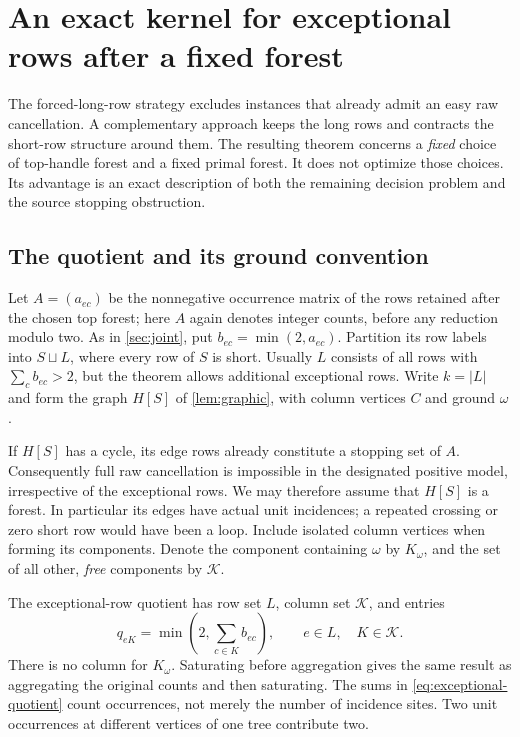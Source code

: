 \section{An exact kernel for exceptional rows after a fixed forest}
\label{sec:exceptional}

The forced-long-row strategy excludes instances that already admit an easy
raw cancellation. A complementary approach keeps the long rows and contracts
the short-row structure around them. The resulting theorem concerns a
\emph{fixed} choice of top-handle forest and a fixed primal forest. It does
not optimize those choices. Its advantage is an exact description of both
the remaining decision problem and the source stopping obstruction.

\subsection{The quotient and its ground convention}

Let $A=(a_{ec})$ be the nonnegative occurrence matrix of the rows retained
after the chosen top forest; here $A$ again denotes integer counts, before
any reduction modulo two. As in \cref{sec:joint}, put
$b_{ec}=\min(2,a_{ec})$. Partition its row labels into $S\sqcup L$, where
every row of $S$ is short. Usually $L$ consists of all rows with
$\sum_c b_{ec}>2$, but the theorem allows additional exceptional rows.
Write $k=|L|$ and form the graph $H[S]$ of \cref{lem:graphic}, with
column vertices $C$ and ground $\omega$.

If $H[S]$ has a cycle, its edge rows already constitute a stopping set of
$A$. Consequently full raw cancellation is impossible in the designated
positive model, irrespective of the exceptional rows. We may therefore
assume that $H[S]$ is a forest. In particular its edges have actual unit
incidences; a repeated crossing or zero short row would have been a loop.
Include isolated column vertices when forming its components. Denote the
component containing $\omega$ by $K_\omega$, and the set of all other,
\emph{free} components by $\mathcal K$.

The exceptional-row quotient has row set $L$, column set $\mathcal K$,
and entries
\begin{equation}
 q_{eK}=\min\left(2,\sum_{c\in K} b_{ec}\right),
 \qquad e\in L,\quad K\in\mathcal K.
 \label{eq:exceptional-quotient}
\end{equation}
There is no column for $K_\omega$. Saturating before aggregation gives
the same result as aggregating the original counts and then saturating.
The sums in \eqref{eq:exceptional-quotient} count occurrences, not merely
the number of incidence sites. Two unit occurrences at different vertices
of one tree contribute two.

